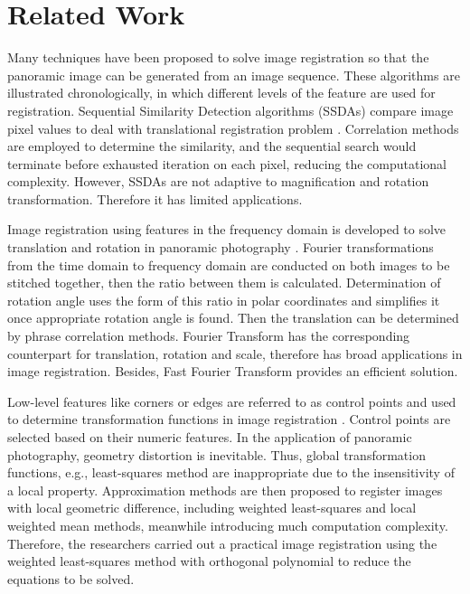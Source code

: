 \documentclass[runningheads]{llncs}
\begin{document}
\section{Related Work}

Many techniques have been proposed to solve image registration so that the panoramic image can be generated from an image sequence. These algorithms are illustrated chronologically, in which different levels of the feature are used for registration. Sequential Similarity Detection algorithms (SSDAs) compare image pixel values to deal with translational registration problem \cite{barnea1972class}. Correlation methods are employed to determine the similarity, and the sequential search would terminate before exhausted iteration on each pixel, reducing the computational complexity. However, SSDAs are not adaptive to magnification and rotation transformation. Therefore it has limited applications.

Image registration using features in the frequency domain is developed to solve translation and rotation in panoramic photography \cite{de1987registration}. Fourier transformations from the time domain to frequency domain are conducted on both images to be stitched together, then the ratio between them is calculated. Determination of rotation angle uses the form of this ratio in polar coordinates and simplifies it once appropriate rotation angle is found. Then the translation can be determined by phrase correlation methods. Fourier Transform has the corresponding counterpart for translation, rotation and scale, therefore has broad applications in image registration. Besides, Fast Fourier Transform provides an efficient solution.

Low-level features like corners or edges are referred to as control points and used to determine transformation functions in image registration \cite{goshtasby1988image}. Control points are selected based on their numeric features. In the application of panoramic photography, geometry distortion is inevitable. Thus, global transformation functions, e.g., least-squares method are inappropriate due to the insensitivity of a local property. Approximation methods are then proposed to register images with local geometric difference, including weighted least-squares and local weighted mean methods, meanwhile introducing much computation complexity. Therefore, the researchers carried out a practical image registration using the weighted least-squares method with orthogonal polynomial to reduce the equations to be solved.
\end{document}
